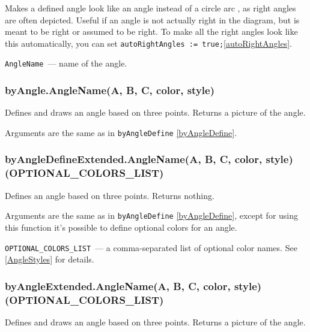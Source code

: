 	Makes a defined angle look like an angle  instead of a circle arc , as right angles are often depicted. Useful if an angle is not actually right in the diagram, but is meant to be right or assumed to be right. To make all the right angles look like this automatically, you can set \texttt{autoRightAngles := true;}\ref{autoRightAngles}.
	
	\texttt{AngleName}~— name of the angle. 


\subsubsection{byAngle.AngleName(A, B, C, color, style)}\label{byAngle}

	Defines and draws an angle based on three points. Returns a picture of the angle.
	
	Arguments are the same as in \texttt{byAngleDefine} \ref{byAngleDefine}.

\subsubsection{byAngleDefineExtended.AngleName(A, B, C, color, style)(OPTIONAL\_COLORS\_LIST)}\label{byAngleDefineExtended}

	Defines an angle based on three points. Returns nothing.
	
	Arguments are the same as in \texttt{byAngleDefine} \ref{byAngleDefine}, except for using this function it's possible to define optional colors for an angle.
	
	\texttt{OPTIONAL\_COLORS\_LIST}~— a comma-separated list of optional color names. See \ref{AngleStyles} for details.
	
\subsubsection{byAngleExtended.AngleName(A, B, C, color, style)(OPTION\-AL\_COLORS\_LIST)}\label{byAngleExtended}

	Defines and draws an angle based on three points. Returns a picture of the angle.
	
